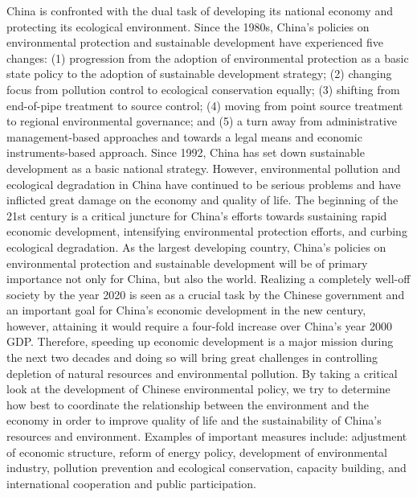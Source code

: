 China is confronted with the dual task of developing its national economy and protecting its ecological environment. Since the 1980s, China's policies on environmental protection and sustainable development have experienced five changes: (1) progression from the adoption of environmental protection as a basic state policy to the adoption of sustainable development strategy; (2) changing focus from pollution control to ecological conservation equally; (3) shifting from end-of-pipe treatment to source control; (4) moving from point source treatment to regional environmental governance; and (5) a turn away from administrative management-based approaches and towards a legal means and economic instruments-based approach. Since 1992, China has set down sustainable development as a basic national strategy. However, environmental pollution and ecological degradation in China have continued to be serious problems and have inflicted great damage on the economy and quality of life. The beginning of the 21st century is a critical juncture for China's efforts towards sustaining rapid economic development, intensifying environmental protection efforts, and curbing ecological degradation. As the largest developing country, China's policies on environmental protection and sustainable development will be of primary importance not only for China, but also the world. Realizing a completely well-off society by the year 2020 is seen as a crucial task by the Chinese government and an important goal for China's economic development in the new century, however, attaining it would require a four-fold increase over China's year 2000 GDP. Therefore, speeding up economic development is a major mission during the next two decades and doing so will bring great challenges in controlling depletion of natural resources and environmental pollution. By taking a critical look at the development of Chinese environmental policy, we try to determine how best to coordinate the relationship between the environment and the economy in order to improve quality of life and the sustainability of China's resources and environment. Examples of important measures include: adjustment of economic structure, reform of energy policy, development of environmental industry, pollution prevention and ecological conservation, capacity building, and international cooperation and public participation.
